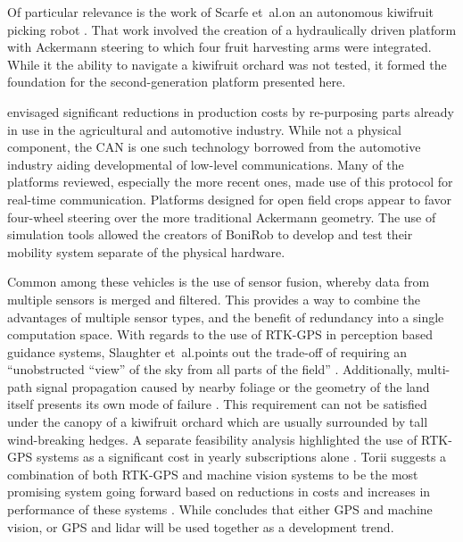 \documentclass[preprint,authoryear,12pt]{elsarticle}
\begin{document}
        Of particular relevance is the work of Scarfe et~al.\@ on an autonomous kiwifruit picking robot \citep{scarfe2009, Scarfe2012}.
        That work involved the creation of a hydraulically driven platform with Ackermann steering to which four fruit harvesting arms were integrated.
        While it the ability to navigate a kiwifruit orchard was not tested, it formed the foundation for the second-generation platform presented here.
        
        \cite{Blackmore2007} envisaged significant reductions in production costs by re-purposing parts already in use in the agricultural and automotive industry.
        While not a physical component, the CAN is one such technology borrowed from the automotive industry aiding developmental of low-level communications.
        Many of the platforms reviewed, especially the more recent ones, made use of this protocol for real-time communication.
        Platforms designed for open field crops appear to favor four-wheel steering over the more traditional Ackermann geometry.
        The use of simulation tools allowed the creators of BoniRob to develop and test their mobility system separate of the physical hardware.

        Common among these vehicles is the use of sensor fusion, whereby data from multiple sensors is merged and filtered.
        This provides a way to combine the advantages of multiple sensor types, and the benefit of redundancy  into a single computation space.
        With regards to the use of RTK-GPS in perception based guidance systems, Slaughter et~al.\@ points out the trade-off of requiring an ``unobstructed ``view'' of the sky from all parts of the field'' \citep{Slaughter2008}.
        Additionally, multi-path signal propagation caused by nearby foliage or the geometry of the land itself presents its own mode of failure \citep{Durrant-Whyte2005}.
        This requirement can not be satisfied under the canopy of a kiwifruit orchard which are usually surrounded by tall wind-breaking hedges.
        A separate feasibility analysis highlighted the use of RTK-GPS systems as a significant cost in yearly subscriptions alone \citep{Pedersen2006}.
        Torii suggests a combination of both RTK-GPS and machine vision systems to be the most promising system going forward based on reductions in costs and increases in performance of these systems \cite{Torii2000}.
        While \cite{Li2009} concludes that either GPS and machine vision, or GPS and lidar will be used together as a development trend.
\end{document}
